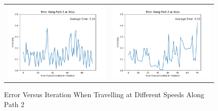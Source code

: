 \documentclass{article}
\begin{document}
\begin{figure}[h]
\begin{center}
\begin{tabular}{c|c}
    \includegraphics[scale=.5]{path2_speed3_error.png} & \includegraphics[scale=.5]{path2_speed4_error.png} \\
\end{tabular}
\caption{Error Versus Iteration When Travelling at Different Speeds Along Path 2}
\end{center}
\end{figure}
\end{document}
